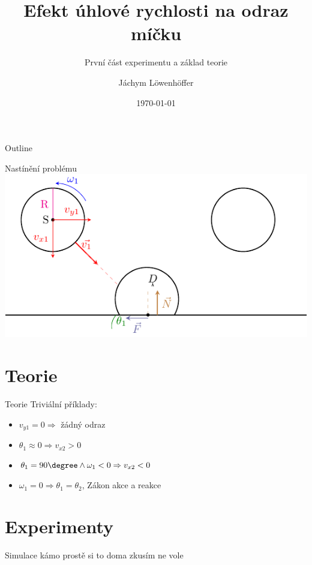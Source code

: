 \documentclass{beamer}
\title{Efekt úhlové rychlosti na odraz míčku}
\subtitle{První část experimentu a základ teorie}
\author{Jáchym Löwenhöffer}
\institute{GEVO JM}
\date{\today}
\begin{document}
 
 \begin{frame}
  \titlepage
 \end{frame}

 \begin{frame}{Outline}
  \tableofcontents
 \end{frame}

 \begin{frame}{Nastínění problému}
  \includegraphics{diagram.pdf}
 \end{frame}

 \section{Teorie} 

\begin{frame}
 \sectionpage
\end{frame}

 \begin{frame}{Teorie}
  Triviální příklady:
  \begin{itemize}
   \item $v_{y1}=0 \Rightarrow $ žádný odraz
   \item $\theta_1\approx0 \Rightarrow v_{x2} > 0$
   \item $\theta_1=90\degree \land \omega_1<0 \Rightarrow v_{x2} < 0 $
   \item $\omega_1=0 \Rightarrow \theta_1=\theta_2 $, Zákon akce a reakce
  \end{itemize}
 \end{frame}

\section{Experimenty}
\begin{frame}
 \sectionpage
\end{frame}

 \begin{frame}{Simulace}
 kámo prostě si to doma zkusím ne vole
\end{frame}
\end{document}
